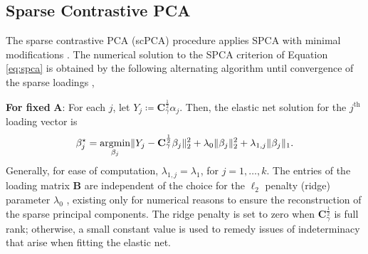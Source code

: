 \subsection{Sparse Contrastive PCA}

The sparse contrastive PCA (scPCA) procedure applies SPCA with minimal modifications . The
numerical solution to the SPCA criterion of Equation \eqref{eq:spca} is obtained by
the following alternating algorithm until convergence of the sparse loadings
\citep{Zou2006}, 

\textbf{For fixed} $\mathbf{A}$: For each $j$, let
$Y_j \coloneqq \mathbf{C}_\gamma^{\frac{1}{2}}\alpha_j$. Then, the elastic net solution for
the $j^{\text{th}}$ loading vector is
\begin{equation*}
  \beta_j^\star = \operatorname*{argmin}_{\beta_j} \lVert Y_j - \mathbf{C}_\gamma^{\frac{1}{2}}
  \beta_j \rVert_2^2 + \lambda_0 \lVert \beta_j \rVert_2^2 + \lambda_{1, j}
  \lVert \beta_j \rVert_1.
\end{equation*}
Generally, for ease of computation, $\lambda_{1, j} = \lambda_1$, for
$j=1, \ldots, k$. The entries of the loading matrix $\mathbf{B}$ are independent of
the choice for the $\ell_2$ penalty (ridge) parameter $\lambda_0$
\citep{Zou2006}, existing only for numerical reasons to ensure the reconstruction of the sparse principal components. The ridge penalty is set to zero when
$\mathbf{C}^{\frac{1}{2}}_\gamma$ is full rank; otherwise, a small constant
value is used to remedy issues of indeterminacy that arise when fitting the
elastic net.

